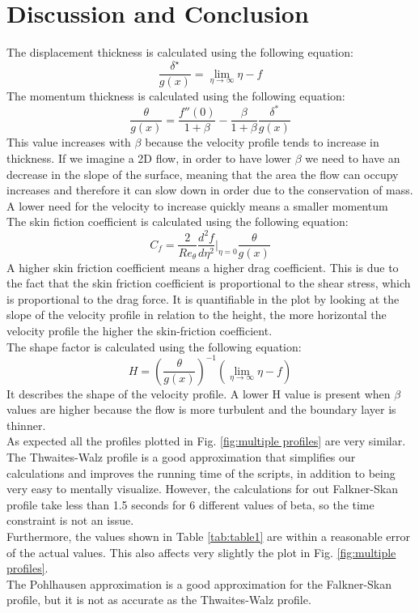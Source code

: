 \documentclass[conf]{new-aiaa}
\begin{document}
\section{Discussion and Conclusion} \label{sec:conclusion}
The displacement thickness is calculated using the following equation:
\begin{equation}
   \frac{\delta^\star}{g(x)}=\lim_{\eta \to \infty} \eta -f
\end{equation}
The momentum thickness is calculated using the following equation:
\begin{equation}
    \frac{\theta}{g(x)} = \frac{f''(0)}{1+\beta}-\frac{\beta}{1+\beta}\frac{\delta^*}{g(x)}
\end{equation}
This value increases with $\beta$ because the velocity profile tends to increase in thickness. If we imagine a 2D flow, in order to have lower $\beta$ we need to have an decrease in the slope of the surface, meaning that the area the flow can occupy increases  and therefore it can slow down in order due to the conservation of mass. 
A lower need for the velocity to increase quickly means a smaller momentum \\
The skin fiction coefficient is calculated using the following equation:
\begin{equation}
    C_f=\frac{2}{Re_{\theta}}\frac{d^2f}{d\eta^2}\Big|_{\eta=0}\frac{\theta}{g(x)}
\end{equation}
A higher skin friction coefficient means a higher drag coefficient. This is due to the fact that the skin friction coefficient is proportional to the shear stress, which is proportional to the drag force. It is quantifiable in the plot by looking at the slope of the velocity profile in relation to the height, the more horizontal the velocity profile the higher the skin-friction coefficient.\\
The shape factor is calculated using the following equation:
\begin{equation}
    H=\left(\frac{\theta}{g(x)}\right)^{-1} \left(\lim_{\eta \to \infty} \eta-f\right)
\end{equation}
It describes the shape of the velocity profile. A lower H value is present when $\beta$ values are higher because the flow is more turbulent and the boundary layer is thinner. \\
As expected all the profiles plotted in Fig. \ref{fig:multiple profiles} are very similar. The Thwaites-Walz profile is a good approximation that simplifies our calculations and improves the running time of the scripts, in addition to being very easy to mentally visualize. 
However, the calculations for out Falkner-Skan profile take less than 1.5 seconds for 6 different values of beta, so the time constraint is not an issue. \\
Furthermore, the values shown in Table \ref{tab:table1} are within a reasonable error of the actual values. This also affects very slightly the plot in Fig. \ref{fig:multiple profiles}. \\
The Pohlhausen approximation is a good approximation for the Falkner-Skan profile, but it is not as accurate as the Thwaites-Walz profile. \\
\appendix
\end{document}
